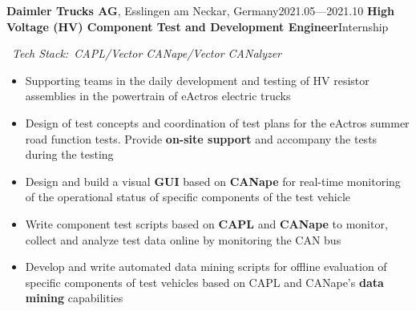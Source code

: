 \documentclass{resume}
\begin{document}
\worksubsection
  {\textbf{Daimler Trucks AG}, Esslingen am Neckar, Germany}{2021.05—2021.10}
\workpossubsection
  {\textbf{High Voltage (HV) Component Test and Development Engineer}}{Internship}

\ \textit{Tech Stack:\ CAPL/Vector CANape/Vector CANalyzer}
\begin{itemize}
  \item Supporting teams in the daily development and testing of HV resistor assemblies in the powertrain of eActros electric trucks
  \item Design of test concepts and coordination of test plans for the eActros summer road function tests. Provide \textbf{on-site support} and accompany the tests during the testing
  \item Design and build a visual \textbf{GUI} based on \textbf{CANape} for real-time monitoring of the operational status of specific components of the test vehicle
  \item Write component test scripts based on \textbf{CAPL} and \textbf{CANape} to monitor, collect and analyze test data online by monitoring the CAN bus
  \item Develop and write automated data mining scripts for offline evaluation of specific components of test vehicles based on CAPL and CANape's \textbf{data mining} capabilities
\end{itemize}
\vspace{0.15cm}

\newpage
\end{document}
